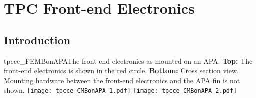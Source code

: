 





\section{TPC Front-end Electronics}
\label{ch:ce}

%
\subsection{Introduction}
\label{subsec:ce_intro}

\begin{cdrfigure}{tpcce_FEMBonAPA}{The 
front-end electronics as mounted on an APA.
  {\bf Top:} The front-end electronics is shown in the red circle.
  {\bf Bottom:} Cross section view. Mounting hardware between the front-end electronics 
and the APA fin is not shown.}
\texttt{[image: tpcce\_CMBonAPA\_1.pdf]}
\texttt{[image: tpcce\_CMBonAPA\_2.pdf]}
\end{cdrfigure}

